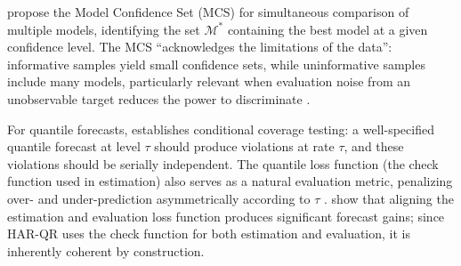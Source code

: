 \textcite{hansen2011model} propose the Model Confidence Set (MCS) for
simultaneous comparison of multiple models, identifying the set
$\mathcal{M}^*$ containing the best model at a given confidence level.
The MCS ``acknowledges the limitations of the data'': informative
samples yield small confidence sets, while uninformative samples include
many models, particularly relevant when evaluation noise from an
unobservable target reduces the power to discriminate
\parencite{clementsHarvestingHARXVolatility2024,
degiannakisForecastingRealizedVolatility2022}.

For quantile forecasts, \textcite{christoffersen1998evaluating}
establishes conditional coverage testing: a well-specified quantile
forecast at level $\tau$ should produce violations at rate $\tau$, and
these violations should be serially independent. The quantile loss
function (the check function used in estimation) also serves as a
natural evaluation metric, penalizing over- and under-prediction
asymmetrically according to $\tau$
\parencite{lyocsaImprovingStockMarket2021}.
\textcite{pukeCoherentForecastingRealized2026} show that aligning the
estimation and evaluation loss function produces significant forecast
gains; since HAR-QR uses the check function for both estimation and
evaluation, it is inherently coherent by construction.
